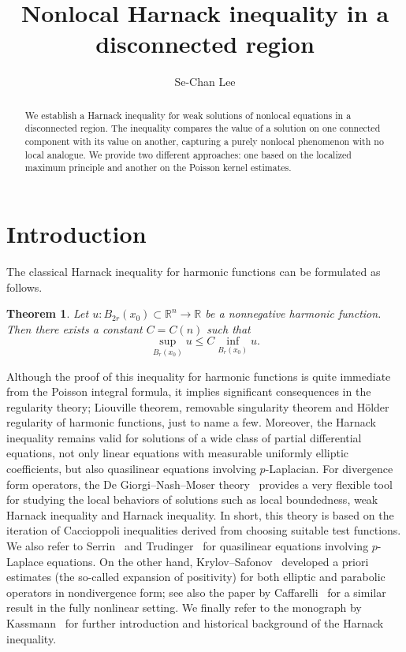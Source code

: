 \documentclass[11pt]{amsart}
\title{Nonlocal Harnack inequality in a disconnected region}
\author{Se-Chan Lee}
\theoremstyle{plain}
\newtheorem{theorem}{Theorem}[section]
\theoremstyle{definition}
\numberwithin{equation}{section}
\begin{document}
\begin{abstract}
    We establish a Harnack inequality for weak solutions of nonlocal equations in a disconnected region. The inequality compares the value of a solution on one connected component with its value on another, capturing a purely nonlocal phenomenon with no local analogue. We provide two different approaches: one based on the localized maximum principle and another on the Poisson kernel estimates.
\end{abstract}
	
\maketitle

\section{Introduction}\label{sec-introduction}


The classical Harnack inequality for harmonic functions can be formulated as follows.

\begin{theorem}\label{thm-harnack-classical}
    Let $u: B_{2r}(x_0) \subset \mathbb{R}^n \to \mathbb{R}$ be a nonnegative harmonic function. Then there exists a constant $C=C(n)$ such that
    \begin{equation*}
        \sup_{B_r(x_0)}u \leq C\inf_{B_r(x_0)}u.
    \end{equation*}
\end{theorem}

Although the proof of this inequality for harmonic functions is quite immediate from the Poisson integral formula, it implies significant consequences in the regularity theory; Liouville theorem, removable singularity theorem and H\"older regularity of harmonic functions, just to name a few. Moreover, the Harnack inequality remains valid for solutions of a wide class of partial differential equations, not only linear equations with measurable uniformly elliptic coefficients, but also quasilinear equations involving $p$-Laplacian. For divergence form operators, the De Giorgi--Nash--Moser theory~\cite{DG57, Nas58, Mos60, Mos61} provides a very flexible tool for studying the local behaviors of solutions such as local boundedness, weak Harnack inequality and Harnack inequality. In short, this theory is based on the iteration of Caccioppoli inequalities derived from choosing suitable test functions. We also refer to Serrin~\cite{Ser64} and Trudinger~\cite{Tru67} for quasilinear equations involving $p$-Laplace equations. On the other hand, Krylov--Safonov~\cite{KS79,KS80} developed a priori estimates (the so-called expansion of positivity) for both elliptic and parabolic operators in nondivergence form; see also the paper by Caffarelli~\cite{Caf89} for a similar result in the fully nonlinear setting. We finally refer to the monograph by Kassmann~\cite{Kas07} for further introduction and historical background of the Harnack inequality.
\end{document}
